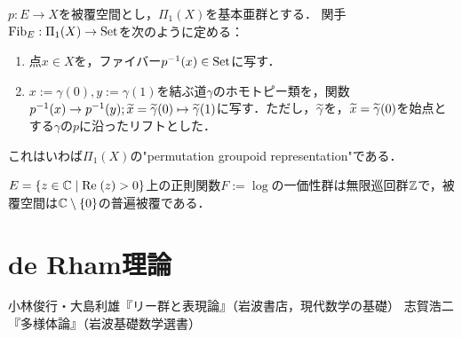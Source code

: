 \documentclass[uplatex,dvipdfmx]{jsreport}
\begin{document}
\begin{definition}
    $p:E\to X$を被覆空間とし，$\Pi_1(X)$を基本亜群とする．
    関手$\mathrm{Fib}_E:\Pi_1(X)\to\mathrm{Set}$を次のように定める：
    \begin{enumerate}
        \item 点$x\in X$を，ファイバー$p^{-1}(x)\in\mathrm{Set}$に写す．
        \item $x:=\gamma(0),y:=\gamma(1)$を結ぶ道$\gamma$のホモトピー類を，関数$p^{-1}(x)\to p^{-1}(y);\widetilde{x}=\widetilde{\gamma}(0)\mapsto \widetilde{\gamma}(1)$に写す．ただし，$\widetilde{\gamma}$を，$\widetilde{x}=\widetilde{\gamma}(0)$を始点とする$\gamma$の$p$に沿ったリフトとした．
    \end{enumerate}
\end{definition}
\begin{remarks}
    これはいわば$\Pi_1(X)$の"permutation groupoid representation"である．
\end{remarks}

\begin{example}
    $E=\left\{z\in\mathbb{C}\mid\mathrm{Re}\;(z)>0\right\}$上の正則関数$F:=\log$の一価性群は無限巡回群$\mathbb{Z}$で，被覆空間は$\mathbb{C}\setminus\{0\}$の普遍被覆である．
\end{example}

\chapter{de Rham理論}

\begin{thebibliography}{9}
    小林俊行・大島利雄『リー群と表現論』（岩波書店，現代数学の基礎）
    志賀浩二『多様体論』（岩波基礎数学選書）
\end{thebibliography}
\end{document}
